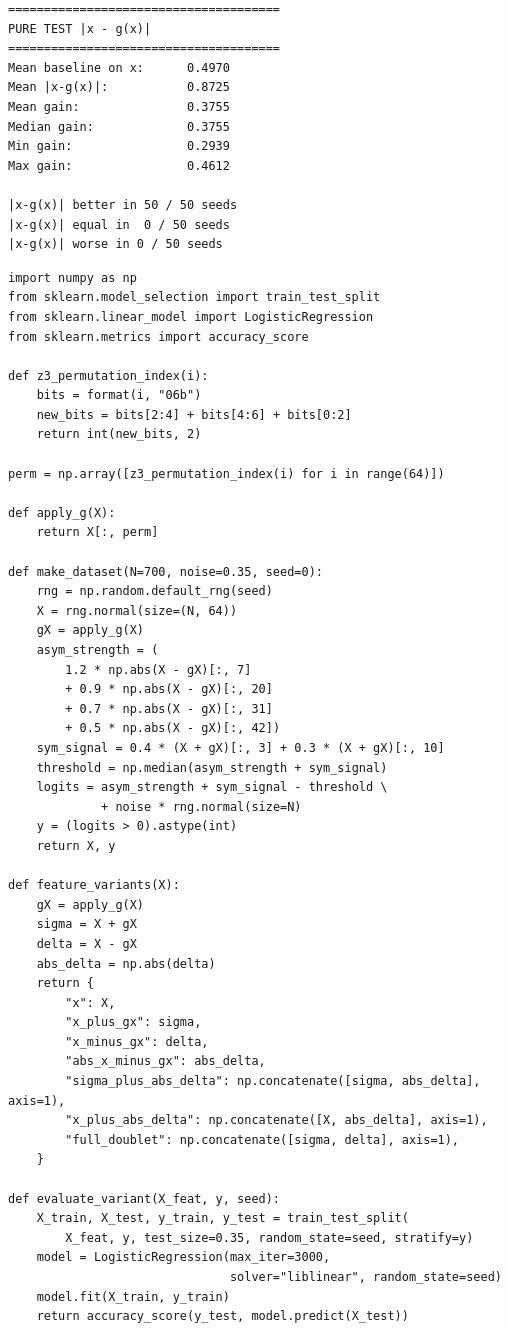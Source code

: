 \documentclass[11pt,a4paper]{report}
\begin{document}
\label{app:ch3-lst8}
\begin{lstlisting}[style=textstyle, caption=Result of SBOHN-4 experiment]
======================================
PURE TEST |x - g(x)|
======================================
Mean baseline on x:      0.4970
Mean |x-g(x)|:           0.8725
Mean gain:               0.3755
Median gain:             0.3755
Min gain:                0.2939
Max gain:                0.4612

|x-g(x)| better in 50 / 50 seeds
|x-g(x)| equal in  0 / 50 seeds
|x-g(x)| worse in 0 / 50 seeds
\end{lstlisting}

\label{app:ch3-lst9}
\begin{lstlisting}[caption=SBOHN Experiment 5: feature variant comparison]
import numpy as np
from sklearn.model_selection import train_test_split
from sklearn.linear_model import LogisticRegression
from sklearn.metrics import accuracy_score

def z3_permutation_index(i):
    bits = format(i, "06b")
    new_bits = bits[2:4] + bits[4:6] + bits[0:2]
    return int(new_bits, 2)

perm = np.array([z3_permutation_index(i) for i in range(64)])

def apply_g(X):
    return X[:, perm]

def make_dataset(N=700, noise=0.35, seed=0):
    rng = np.random.default_rng(seed)
    X = rng.normal(size=(N, 64))
    gX = apply_g(X)
    asym_strength = (
        1.2 * np.abs(X - gX)[:, 7]
        + 0.9 * np.abs(X - gX)[:, 20]
        + 0.7 * np.abs(X - gX)[:, 31]
        + 0.5 * np.abs(X - gX)[:, 42])
    sym_signal = 0.4 * (X + gX)[:, 3] + 0.3 * (X + gX)[:, 10]
    threshold = np.median(asym_strength + sym_signal)
    logits = asym_strength + sym_signal - threshold \
             + noise * rng.normal(size=N)
    y = (logits > 0).astype(int)
    return X, y

def feature_variants(X):
    gX = apply_g(X)
    sigma = X + gX
    delta = X - gX
    abs_delta = np.abs(delta)
    return {
        "x": X,
        "x_plus_gx": sigma,
        "x_minus_gx": delta,
        "abs_x_minus_gx": abs_delta,
        "sigma_plus_abs_delta": np.concatenate([sigma, abs_delta], axis=1),
        "x_plus_abs_delta": np.concatenate([X, abs_delta], axis=1),
        "full_doublet": np.concatenate([sigma, delta], axis=1),
    }

def evaluate_variant(X_feat, y, seed):
    X_train, X_test, y_train, y_test = train_test_split(
        X_feat, y, test_size=0.35, random_state=seed, stratify=y)
    model = LogisticRegression(max_iter=3000,
                               solver="liblinear", random_state=seed)
    model.fit(X_train, y_train)
    return accuracy_score(y_test, model.predict(X_test))


\end{lstlisting}
\end{document}
